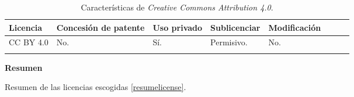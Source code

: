 \begin{longtable}[]{@{}llllllll@{}} 
\toprule 
\begin{minipage}[b]{0.15\columnwidth}\raggedright\strut
Licencia\strut
\end{minipage} & \begin{minipage}[b]{0.18\columnwidth}\raggedright\strut
Concesión de patente\strut
\end{minipage} & \begin{minipage}[b]{0.17\columnwidth}\raggedright\strut
Uso privado\strut
\end{minipage} & \begin{minipage}[b]{0.15\columnwidth}\raggedright\strut
Sublicenciar\strut
\end{minipage} & \begin{minipage}[b]{0.17\columnwidth}\raggedright\strut
Modificación\strut
\end{minipage}\tabularnewline
\midrule
\endhead
\begin{minipage}[t]{0.15\columnwidth}\raggedright\strut
CC BY 4.0\strut
\end{minipage} & \begin{minipage}[t]{0.18\columnwidth}\raggedright\strut
No.\strut
\end{minipage} & \begin{minipage}[t]{0.17\columnwidth}\raggedright\strut
Sí.\strut
\end{minipage} & \begin{minipage}[t]{0.15\columnwidth}\raggedright\strut
Permisivo.\strut
\end{minipage} & \begin{minipage}[t]{0.17\columnwidth}\raggedright\strut
No.\strut
\end{minipage}\tabularnewline
\bottomrule
\caption{Características de \textit{Creative Commons Attribution 4.0}.}
\label{tab:ccaresumetable1}
\end{longtable}

\textbf{Resumen}

Resumen de las licencias escogidas \ref{resumelicense}.

